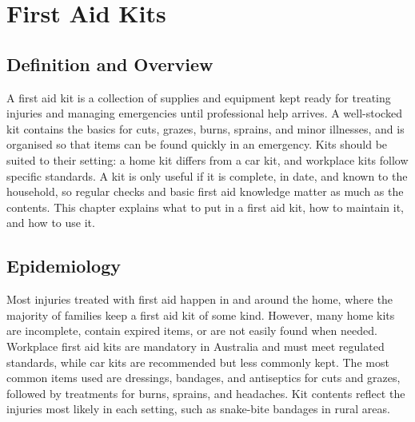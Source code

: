 \chapter{First Aid Kits}

\section*{Definition and Overview}
A first aid kit is a collection of supplies and equipment kept ready for treating injuries and managing emergencies until professional help arrives. A well-stocked kit contains the basics for cuts, grazes, burns, sprains, and minor illnesses, and is organised so that items can be found quickly in an emergency. Kits should be suited to their setting: a home kit differs from a car kit, and workplace kits follow specific standards. A kit is only useful if it is complete, in date, and known to the household, so regular checks and basic first aid knowledge matter as much as the contents. This chapter explains what to put in a first aid kit, how to maintain it, and how to use it.

\section*{Epidemiology}
Most injuries treated with first aid happen in and around the home, where the majority of families keep a first aid kit of some kind. However, many home kits are incomplete, contain expired items, or are not easily found when needed. Workplace first aid kits are mandatory in Australia and must meet regulated standards, while car kits are recommended but less commonly kept. The most common items used are dressings, bandages, and antiseptics for cuts and grazes, followed by treatments for burns, sprains, and headaches. Kit contents reflect the injuries most likely in each setting, such as snake-bite bandages in rural areas.

